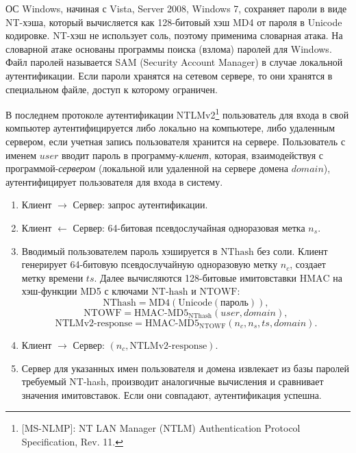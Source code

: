 \documentclass[10pt,a4paper]{book}
\newcommand{\HMAC}{\textrm{HMAC}}
\begin{document}

ОС Windows, начиная с Vista, Server 2008, Windows 7, сохраняет пароли в виде NT-хэша, который вычисляется как 128-битовый хэш MD4 от пароля в Unicode кодировке. NT-хэш не использует соль, поэтому применима словарная атака. На словарной атаке основаны программы поиска (взлома) паролей для Windows. Файл паролей называется SAM (Security Account Manager) в случае локальной аутентификации. Если пароли хранятся на сетевом сервере, то они хранятся в специальном файле, доступ к которому ограничен.

В последнем протоколе аутентификации NTLMv2\footnote{[MS-NLMP]: NT LAN Manager (NTLM) Authentication Protocol Specification, Rev. 11.} пользователь для входа в свой компьютер аутентифицируется либо локально на компьютере, либо удаленным сервером, если учетная запись пользователя хранится на сервере. Пользователь с именем $user$ вводит пароль в программу-\emph{клиент}, которая, взаимодействуя с программой-\emph{сервером} (локальной или удаленной на сервере домена $domain$), аутентифицирует пользователя для входа в систему.
\begin{enumerate}
    \item Клиент $\rightarrow$ Сервер: запрос аутентификации.
    \item Клиент $\leftarrow$ Сервер: 64-битовая псевдослучайная одноразовая метка $n_s$.
    \item Вводимый пользователем пароль хэшируется в $\textrm{NThash}$ без соли. Клиент генерирует 64-битовую псевдослучайную одноразовую метку $n_c$, создает метку времени $ts$. Далее вычисляются 128-битовые имитовставки $\HMAC$ на хэш-функции MD5 с ключами $\textrm{NT-hash}$ и $\textrm{NTOWF}$:
        \[ \textrm{NThash} = \text{MD4}(\text{Unicode}(\text{пароль})), \]
        \[ \textrm{NTOWF} = \textrm{HMAC-MD5}_{\textrm{NThash}}(user, domain), \]
        \[ \textrm{NTLMv2-response} = \textrm{HMAC-MD5}_{\textrm{NTOWF}}(n_c, n_s, ts, domain). \]
    \item Клиент $\rightarrow$ Сервер: $(n_c, \textrm{NTLMv2-response})$. %
    \item Сервер для указанных имен пользователя и домена извлекает из базы паролей требуемый NT-hash, производит аналогичные вычисления и сравнивает значения имитовставок. Если они совпадают, аутентификация успешна.
\end{enumerate}
\end{document}
